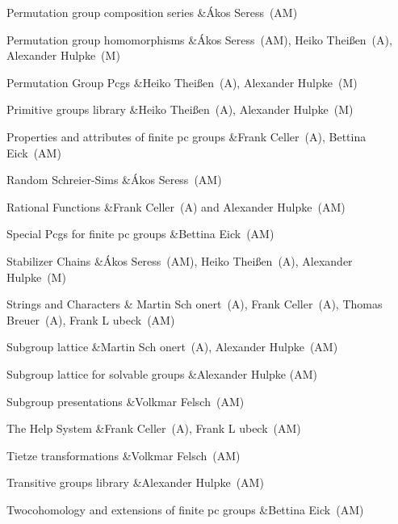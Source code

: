 \item{} Permutation group composition series 
&{\'A}kos Seress~(AM)

\item{} Permutation group homomorphisms 
&{\'A}kos Seress~(AM), Heiko Thei{\ss}en~(A), Alexander Hulpke~(M)

\item{} Permutation Group Pcgs 
&Heiko Thei{\ss}en~(A), Alexander Hulpke~(M)

\item{} Primitive groups library 
&Heiko Thei{\ss}en~(A), Alexander Hulpke~(M)

\item{} Properties and attributes of finite pc groups 
&Frank Celler~(A), Bettina Eick~(AM)

\item{} Random Schreier-Sims 
&{\'A}kos Seress~(AM)

\item{} Rational Functions 
&Frank Celler~(A) and Alexander Hulpke~(AM)

\item{} Special Pcgs for finite pc groups 
&Bettina Eick~(AM)

\item{} Stabilizer Chains 
&{\'A}kos Seress~(AM), Heiko Thei{\ss}en~(A), Alexander Hulpke~(M)

\item{} Strings and Characters 
& Martin Sch{ o}nert~(A), Frank Celler~(A), Thomas Breuer~(A), 
Frank L{ u}beck~(AM)

\item{} Subgroup lattice 
&Martin Sch{ o}nert~(A), Alexander Hulpke~(AM)

\item{} Subgroup lattice for solvable groups 
&Alexander Hulpke (AM)

\item{} Subgroup presentations 
&Volkmar Felsch~(AM)

\item{} The Help System 
&Frank Celler~(A), Frank L{ u}beck~(AM)

\item{} Tietze transformations 
&Volkmar Felsch~(AM)

\item{} Transitive groups library 
&Alexander Hulpke~(AM)

\item{} Twocohomology and extensions of finite pc groups 
&Bettina Eick~(AM)
\enditems







